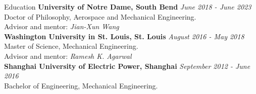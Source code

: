 \documentclass{resume} %
\begin{document}

\begin{rSection}{Education}
{\bf University of Notre Dame, South Bend} \hfill {\em June 2018 - June 2023} 
\\ Doctor of Philosophy, Aerospace and Mechanical Engineering.\\
Advisor and mentor: \textit{Jian-Xun Wang}\\
{\bf Washington University in St. Louis, St. Louis} \hfill {\em August 2016 - May 2018} 
\\ Master of Science, Mechanical Engineering.\\
Advisor and mentor: \textit{Ramesh K. Agarwal}\\
{\bf Shanghai University of Electric Power, Shanghai} \hfill {\em September 2012 - June 2016} 
\\ Bachelor of Engineering, Mechanical Engineering.\\
\end{rSection}
\end{document}
